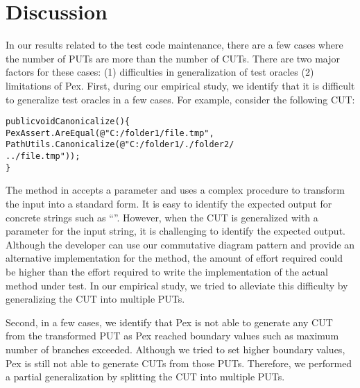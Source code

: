 \section{Discussion} 
\label{sec:limitations}

In our results related to the test code maintenance, there are a few cases where the number of PUTs are more than the number of CUTs. There are two major factors for these cases: (1) difficulties in generalization of test oracles (2) limitations of Pex. First, during our empirical study, we identify that it is difficult to generalize test oracles in a few cases. For example, consider the following CUT:\vspace*{-1ex}

\begin{CodeOut}
\begin{alltt}
public void Canonicalize() \{
\hspace*{0.1in}PexAssert.AreEqual(@"C:/folder1/file.tmp",
\hspace*{0.3in}PathUtils.Canonicalize(@"C:/folder1/./folder2/
\hspace*{0.3in}../file.tmp")); 
\}
\end{alltt}
\end{CodeOut}

The  method in  accepts a  parameter and uses a complex procedure to transform the input into a standard form. It is easy to identify the expected output for concrete strings such as ``''. However, when the CUT is generalized with a parameter for the input string, it is challenging to identify the expected output. Although the developer can use our commutative diagram pattern and provide an alternative implementation for the  method, the amount of effort required could be higher than the effort required to write the implementation of the actual method under test. In our empirical study, we tried to alleviate this difficulty by generalizing the CUT into multiple PUTs. 

Second, in a few cases, we identify that Pex is not able to generate any CUT from the transformed PUT as Pex reached boundary values such as maximum number of branches exceeded. Although we tried to set higher boundary values, Pex is still not able to generate CUTs from those PUTs. Therefore, we performed a partial generalization by splitting the CUT into multiple PUTs.

